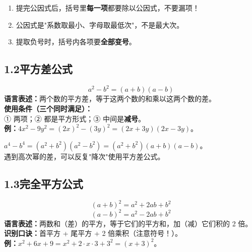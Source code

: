 \documentclass[12pt, a4paper]{ctexart}
\begin{document}
\begin{warnbox}[易错提醒]
\begin{enumerate}[leftmargin=18pt]
\item 提完公因式后，括号里\textbf{每一项}都要除以公因式，不要漏项！
\item 公因式是"系数取最小、字母取最低次"，不是最大次。
\item 提取负号时，括号内各项要\textbf{全部变号}。
\end{enumerate}
\end{warnbox}

\subsection*{1.2\quad 平方差公式}

\begin{knowledgebox}[平方差公式]
\[
\boxed{a^2 - b^2 = (a+b)(a-b)}
\]
\textbf{语言表述：}两个数的平方差，等于这两个数的和乘以这两个数的差。\\[6pt]
\textbf{使用条件（三个同时满足）：}\\
① 两项；\quad ② 都是平方形式；\quad ③ 中间是\textbf{减号}。\\[6pt]
\textbf{例：}\quad $4x^2 - 9y^2 = (2x)^2 - (3y)^2 = (2x+3y)(2x-3y)$。
\end{knowledgebox}

\begin{tipbox}[推广——多次使用平方差]
$a^4 - b^4 = (a^2+b^2)(a^2-b^2) = (a^2+b^2)(a+b)(a-b)$。\\[3pt]
遇到高次幂的差，可以反复"降次"使用平方差公式。
\end{tipbox}

\subsection*{1.3\quad 完全平方公式}

\begin{knowledgebox}[完全平方公式]
\[
\boxed{(a+b)^2 = a^2 + 2ab + b^2}
\]
\[
\boxed{(a-b)^2 = a^2 - 2ab + b^2}
\]
\textbf{语言表述：}两数和（差）的平方，等于它们的平方和，加（减）它们积的 2 倍。\\[6pt]
\textbf{识别口诀：}首平方 + 尾平方 + 2 倍乘积（注意符号！）。\\[6pt]
\textbf{例：}\quad $x^2 + 6x + 9 = x^2 + 2 \cdot x \cdot 3 + 3^2 = (x+3)^2$。
\end{knowledgebox}
\end{document}
